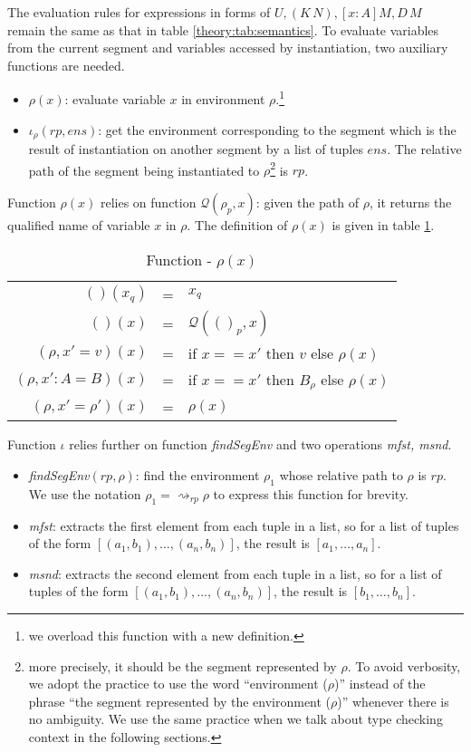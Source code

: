 The evaluation rules for expressions in forms of $U, (K\,N), [x:A]M, D\,M$ remain the same as that in table \ref{theory:tab:semantics}. To evaluate variables from the current segment and variables accessed by instantiation, two auxiliary functions are needed.
\begin{itemize}
\item $\rho(x)$: evaluate variable $x$ in environment $\rho$.\footnote{we overload this function with a new definition.}
\item $\iota_\rho(rp, ens)$: get the environment corresponding to the segment which is the result of instantiation on another segment by a list of tuples $ens$. The relative path of the segment being instantiated  to $\rho$\footnote{more precisely, it should be the segment represented by $\rho$. To avoid verbosity, we adopt the practice to use the word ``environment ($\rho$)'' instead of the phrase ``the segment represented by the environment ($\rho$)'' whenever there is no ambiguity. We use the same practice when we talk about type checking context in the following sections.} is $rp$.
\end{itemize}
Function $\rho(x)$ relies on function $\mathcal{Q}(\rho_p,x)$: given the path of $\rho$, it returns the qualified name of variable $x$ in $\rho$. The definition of $\rho(x)$ is given in table \ref{extension:tab:lookup}. 
\begin{table}[h]
  \centering
  \begin{tabular}{r l l}
    $()(x_q)$ & = & $x_q$ \\
    $()(x)$ & = & $\mathcal{Q}(()_p, x)$ \\
    $(\rho, x' = v)(x)$ & = & if $x == x'$ then $v$ else $\rho(x)$ \\
    $(\rho, x' : A = B)(x)$ & = & if $x==x'$ then $B_\rho$ else $\rho(x)$ \\
    $(\rho, x' = \rho')(x)$ & = & $\rho(x)$
  \end{tabular}
  \caption{Function - $\rho(x)$}
  \label{extension:tab:lookup}
\end{table}

Function $\iota$ relies further on function \emph{findSegEnv} and two operations \emph{mfst, msnd}.
\begin{itemize}
\item \emph{findSegEnv}$(rp, \rho)$: find the environment $\rho_1$ whose relative path to $\rho$ is $rp$. We use the notation $\rho_1 = \rightsquigarrow_{rp}\rho$ to express this function for brevity.
\item \emph{mfst}: extracts the first element from each tuple in a list, so for a list of tuples of the form $[(a_1,b_1),\dots,(a_n,b_n)]$, the result is  $[a_1,\dots,a_n]$.
\item \emph{msnd}: extracts the second element from each tuple in a list, so for a list of tuples of the form $[(a_1,b_1),\dots,(a_n,b_n)]$, the result is $[b_1,\dots,b_n]$.
\end{itemize}

